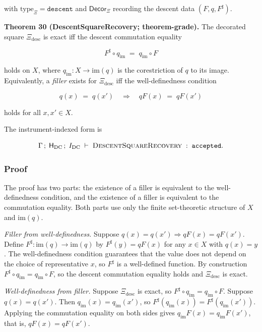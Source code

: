 \documentclass[11pt]{article}
\theoremstyle{definition}
\begin{document}
with \(\mathrm{type}_{\Xi}=\texttt{descent}\) and \(\mathsf{Decor}_{\Xi}\) recording the descent data \((F,q,F^{\sharp})\).

\textbf{Theorem 30 (DescentSquareRecovery; theorem-grade).} The decorated square \(\Xi_{\mathrm{desc}}\) is exact iff the descent commutation equality

\[
F^{\sharp}\circ q_{\mathrm{im}}\;=\;q_{\mathrm{im}}\circ F
\]

holds on \(X\), where \(q_{\mathrm{im}}:X\to\mathrm{im}(q)\) is the corestriction of \(q\) to its image. Equivalently, a \emph{filler} exists for \(\Xi_{\mathrm{desc}}\) iff the well-definedness condition

\[
q(x)\;=\;q(x')\quad\Longrightarrow\quad qF(x)\;=\;qF(x')
\]

holds for all \(x,x'\in X\).

The instrument-indexed form is

\[
\Gamma\,;\;\mathsf H_{\mathrm{DC}}\,;\;I_{\mathrm{DC}}\;\vdash\;\textsc{DescentSquareRecovery}\;:\;\texttt{accepted}.
\]

\subsubsection{Proof}

The proof has two parts: the existence of a filler is equivalent to the well-definedness condition, and the existence of a filler is equivalent to the commutation equality. Both parts use only the finite set-theoretic structure of \(X\) and \(\mathrm{im}(q)\).

\emph{Filler from well-definedness.} Suppose \(q(x)=q(x')\Rightarrow qF(x)=qF(x')\). Define \(F^{\sharp}:\mathrm{im}(q)\to\mathrm{im}(q)\) by \(F^{\sharp}(y)=qF(x)\) for any \(x\in X\) with \(q(x)=y\). The well-definedness condition guarantees that the value does not depend on the choice of representative \(x\), so \(F^{\sharp}\) is a well-defined function. By construction \(F^{\sharp}\circ q_{\mathrm{im}}=q_{\mathrm{im}}\circ F\), so the descent commutation equality holds and \(\Xi_{\mathrm{desc}}\) is exact.

\emph{Well-definedness from filler.} Suppose \(\Xi_{\mathrm{desc}}\) is exact, so \(F^{\sharp}\circ q_{\mathrm{im}}=q_{\mathrm{im}}\circ F\). Suppose \(q(x)=q(x')\). Then \(q_{\mathrm{im}}(x)=q_{\mathrm{im}}(x')\), so \(F^{\sharp}(q_{\mathrm{im}}(x))=F^{\sharp}(q_{\mathrm{im}}(x'))\). Applying the commutation equality on both sides gives \(q_{\mathrm{im}}F(x)=q_{\mathrm{im}}F(x')\), that is, \(qF(x)=qF(x')\).
\end{document}
